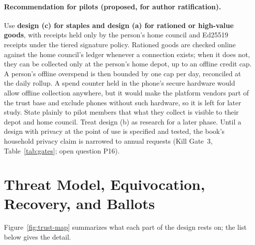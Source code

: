 \documentclass[10pt,twoside,openany]{book}
\theoremstyle{dpepstyle}
\begin{document}
\paragraph{Recommendation for pilots (proposed, for author ratification).} Use \textbf{design (c) for staples and design (a) for rationed or high-value goods}, with receipts held only by the person's home council and Ed25519 receipts under the tiered signature policy. Rationed goods are checked online against the home council's ledger whenever a connection exists; when it does not, they can be collected only at the person's home depot, up to an offline credit cap. A person's offline overspend is then bounded by one cap per day, reconciled at the daily rollup. A spend counter held in the phone's secure hardware would allow offline collection anywhere, but it would make the platform vendors part of the trust base and exclude phones without such hardware, so it is left for later study. State plainly to pilot members that what they collect is visible to their depot and home council. Treat design (b) as research for a later phase. Until a design with privacy at the point of use is specified and tested, the book's household privacy claim is narrowed to annual requests (Kill Gate~3, Table~\ref{tab:gates}; open question P16).

\section{Threat Model, Equivocation, Recovery, and Ballots}
\label{sec:threat-model}
Figure~\ref{fig:trust-map} summarizes what each part of the design rests on; the list below gives the detail.
\end{document}
